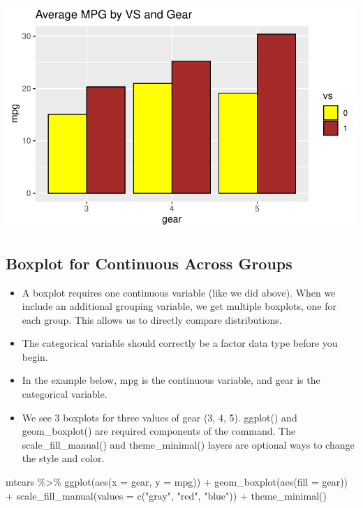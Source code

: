 \documentclass[
  letterpaper,
  DIV=11,
  numbers=noendperiod]{scrreprt}
\newenvironment{Shaded}{\begin{snugshade}}{\end{snugshade}}
\newcommand{\AttributeTok}[1]{\textcolor[rgb]{0.40,0.45,0.13}{#1}}
\newcommand{\FunctionTok}[1]{\textcolor[rgb]{0.28,0.35,0.67}{#1}}
\newcommand{\NormalTok}[1]{\textcolor[rgb]{0.00,0.23,0.31}{#1}}
\newcommand{\SpecialCharTok}[1]{\textcolor[rgb]{0.37,0.37,0.37}{#1}}
\newcommand{\StringTok}[1]{\textcolor[rgb]{0.13,0.47,0.30}{#1}}
\begin{document}
\includegraphics{dataviz_files/figure-pdf/unnamed-chunk-40-1.pdf}

\subsection{Boxplot for Continuous Across
Groups}\label{boxplot-for-continuous-across-groups}

\begin{itemize}
\item
  A boxplot requires one continuous variable (like we did above). When
  we include an additional grouping variable, we get multiple boxplots,
  one for each group. This allows us to directly compare distributions.
\item
  The categorical variable should correctly be a factor data type before
  you begin.
\item
  In the example below, mpg is the continuous variable, and gear is the
  categorical variable.
\item
  We see 3 boxplots for three values of gear (3, 4, 5). ggplot() and
  geom\_boxplot() are required components of the command. The
  scale\_fill\_manual() and theme\_minimal() layers are optional ways to
  change the style and color.
\end{itemize}

\begin{Shaded}
\begin{Highlighting}[]
\NormalTok{mtcars }\SpecialCharTok{\%\textgreater{}\%}
  \FunctionTok{ggplot}\NormalTok{(}\FunctionTok{aes}\NormalTok{(}\AttributeTok{x =}\NormalTok{ gear, }\AttributeTok{y =}\NormalTok{ mpg)) }\SpecialCharTok{+}
  \FunctionTok{geom\_boxplot}\NormalTok{(}\FunctionTok{aes}\NormalTok{(}\AttributeTok{fill =}\NormalTok{ gear)) }\SpecialCharTok{+}
  \FunctionTok{scale\_fill\_manual}\NormalTok{(}\AttributeTok{values =} \FunctionTok{c}\NormalTok{(}\StringTok{"gray"}\NormalTok{, }\StringTok{"red"}\NormalTok{, }\StringTok{"blue"}\NormalTok{)) }\SpecialCharTok{+}
  \FunctionTok{theme\_minimal}\NormalTok{()}
\end{Highlighting}
\end{Shaded}
\end{document}
